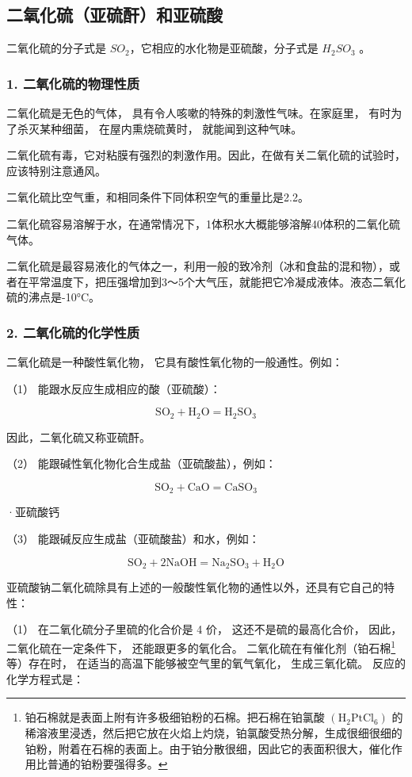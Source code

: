 \subsection{二氧化硫（亚硫酐）和亚硫酸}

二氧化硫的分子式是 \(SO_{2}\)，它相应的水化物是亚硫酸，分子式是
\(H_{2}SO_{3}\) 。

\subsubsection{1. 二氧化硫的物理性质}

二氧化硫是无色的气体， 具有令人咳嗽的特殊的刺激性气味。在家庭里，
有时为了杀灭某种细菌， 在屋内熏烧硫黄时， 就能闻到这种气味。

二氧化硫有毒，它对粘膜有强烈的刺激作用。因此，在做有关二氧化硫的试验时，
应该特别注意通风。

二氧化硫比空气重，和相同条件下同体积空气的重量比是2.2。

二氧化硫容易溶解于水，在通常情况下，1体积水大概能够溶解40体积的二氧化硫气体。

二氧化硫是最容易液化的气体之一，利用一般的致冷剂（冰和食盐的混和物），或者在平常温度下，把压强增加到3～5个大气压，就能把它冷凝成液体。液态二氧化硫的沸点是-10°C。

\subsubsection{2. 二氧化硫的化学性质}

二氧化硫是一种酸性氧化物， 它具有酸性氧化物的一般通性。例如：

（1） 能跟水反应生成相应的酸（亚硫酸）：

\[
\mathrm{SO} _ {2} + \mathrm{H} _ {2} \mathrm{O} = \mathrm{H} _ {2} \mathrm{SO} _ {3}
\]

因此，二氧化硫又称亚硫酐。

（2） 能跟碱性氧化物化合生成盐（亚硫酸盐），例如：

\[
\mathrm{SO} _ {2} + \mathrm{CaO} = \mathrm{CaSO} _ {3}
\]

·亚硫酸钙

（3） 能跟碱反应生成盐（亚硫酸盐）和水，例如：

\[
\mathrm{SO} _ {2} + 2 \mathrm{NaOH} = \mathrm{Na} _ {2} \mathrm{SO} _ {3} + \mathrm{H} _ {2} \mathrm{O}
\]

亚硫酸钠二氧化硫除具有上述的一般酸性氧化物的通性以外，还具有它自己的特性：

（1） 在二氧化硫分子里硫的化合价是 4 价， 这还不是硫的最高化合价，
因此， 二氧化硫在一定条件下， 还能跟更多的氧化合。
二氧化硫在有催化剂（铂石棉\footnote{铂石棉就是表面上附有许多极细铂粉的石棉。把石棉在铂氯酸
  \(\left(\mathrm{H}_{2}\mathrm{PtCl}_{6}\right)\)
  的稀溶液里浸透，然后把它放在火焰上灼烧，铂氯酸受热分解，生成很细很细的铂粉，附着在石棉的表面上。由于铂分散很细，因此它的表面积很大，催化作用比普通的铂粉要强得多。}等）存在时，
在适当的高温下能够被空气里的氧气氧化， 生成三氧化硫。
反应的化学方程式是：


